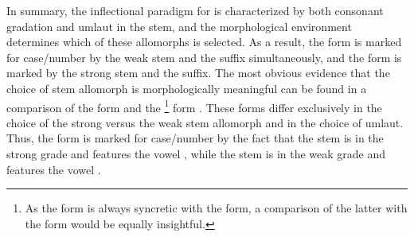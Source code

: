 In summary, the inflectional paradigm for  is characterized by both consonant gradation and umlaut in the stem, %
and the morphological environment determines which of these allomorphs is selected. %
As a result, the  form  is marked for case/number by the weak  stem and the \mbox{} suffix simultaneously, and the  form  is marked by the strong  stem and the  suffix. The most obvious evidence that the choice of stem allomorph is morphologically meaningful can be found in a comparison of the  form  and the \footnote{As the  form is always syncretic with the  form, a comparison of the latter with the  form would be equally insightful.} 
form . These forms differ exclusively in the choice of the strong versus the weak stem allomorph and in the choice of umlaut. Thus, the  form  is marked for case/number by the fact that the stem is in the strong grade and features the vowel , while the  stem is in the weak grade and features the vowel . 


